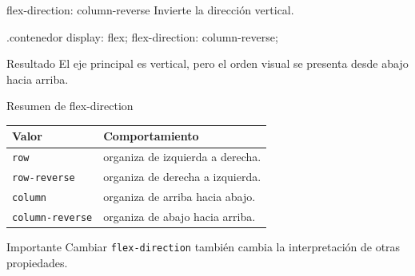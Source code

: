 \documentclass[aspectratio=169,11.5pt]{beamer}
\begin{document}
    \begin{frame}[fragile]{flex-direction: column-reverse}
        Invierte la dirección vertical.

        \begin{csscodedark}
            .contenedor {
                display: flex;
                flex-direction: column-reverse;
            }
        \end{csscodedark}

        \begin{block}{Resultado}
            El eje principal es vertical,
            pero el orden visual se presenta
            desde abajo hacia arriba.
        \end{block}
    \end{frame}

    \begin{frame}{Resumen de flex-direction}
        \begin{center}
            \small
            \begin{tabular}{p{3cm}p{5.8cm}}
                \toprule
                \textbf{Valor} & \textbf{Comportamiento} \\
                \midrule
                \texttt{row} & organiza de izquierda a derecha. \\
                \texttt{row-reverse} & organiza de derecha a izquierda. \\
                \texttt{column} & organiza de arriba hacia abajo. \\
                \texttt{column-reverse} & organiza de abajo hacia arriba. \\
                \bottomrule
            \end{tabular}
        \end{center}

        \begin{alertblock}{Importante}
            Cambiar \texttt{flex-direction} también cambia
            la interpretación de otras propiedades.
        \end{alertblock}
    \end{frame}

\end{document}
